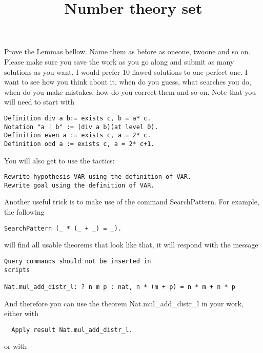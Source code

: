 \documentclass{article}   	%
\title{Number theory set}
\author{}
\date{}							%
\begin{document}
\maketitle

\newtheorem{axiom}{Axiom}
\newtheorem{lemma}{Lemma}
\newtheorem{definition}{Definition}

\newtheorem{puzzle}{Puzzle}
Prove the Lemmas bellow. Name them as before as oneone,  twoone and so on. Please make sure you save the work as you go along and submit as many solutions as you want. I would prefer 10  flawed solutions to one perfect one. I want to see how you think about it, when do you guess, what searches you do, when do you make mistakes, how do you correct them and so on.
Note that you will need to start with
\begin{verbatim}
Definition div a b:= exists c, b = a* c.
Notation "a | b" := (div a b)(at level 0).
Definition even a := exists c, a = 2* c.
Definition odd a := exists c, a = 2* c+1.

\end{verbatim}

You will also get to use the tactics:
\begin{verbatim}
Rewrite hypothesis VAR using the definition of VAR.
Rewrite goal using the definition of VAR.
\end{verbatim}


Another useful trick is to make use of the  command SearchPattern. For example, the following

\begin{verbatim}
SearchPattern (_ * (_ + _) = _).
\end{verbatim}
will find all usable theorems that look like that, it will respond with the message

\begin{verbatim}
Query commands should not be inserted in
scripts

Nat.mul_add_distr_l: ? n m p : nat, n * (m + p) = n * m + n * p
\end{verbatim}
 And therefore you can use the theorem Nat.mul\_add\_distr\_l in your work, either with 
 \begin{verbatim}
  Apply result Nat.mul_add_distr_l.
 \end{verbatim}
  or with
  
\end{document}
